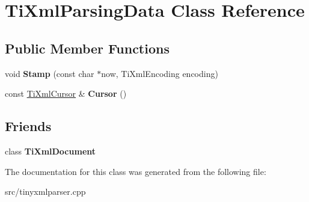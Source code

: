 \hypertarget{classTiXmlParsingData}{
\section{\-Ti\-Xml\-Parsing\-Data \-Class \-Reference}
\label{d6/d7d/classTiXmlParsingData}
}
\subsection*{\-Public \-Member \-Functions}
\begin{DoxyCompactItemize}
\item 
\hypertarget{classTiXmlParsingData_a65cee8ab77a36c605db08c84b4c30a7d}{
void {\bfseries \-Stamp} (const char $\ast$now, \-Ti\-Xml\-Encoding encoding)}
\label{d6/d7d/classTiXmlParsingData_a65cee8ab77a36c605db08c84b4c30a7d}

\item 
\hypertarget{classTiXmlParsingData_a56908a17d7d7a6b2e511e62cf1d40d05}{
const \hyperlink{structTiXmlCursor}{\-Ti\-Xml\-Cursor} \& {\bfseries \-Cursor} ()}
\label{d6/d7d/classTiXmlParsingData_a56908a17d7d7a6b2e511e62cf1d40d05}

\end{DoxyCompactItemize}
\subsection*{\-Friends}
\begin{DoxyCompactItemize}
\item 
\hypertarget{classTiXmlParsingData_a173617f6dfe902cf484ce5552b950475}{
class {\bfseries \-Ti\-Xml\-Document}}
\label{d6/d7d/classTiXmlParsingData_a173617f6dfe902cf484ce5552b950475}

\end{DoxyCompactItemize}


\-The documentation for this class was generated from the following file\-:\begin{DoxyCompactItemize}
\item 
src/tinyxmlparser.\-cpp\end{DoxyCompactItemize}
